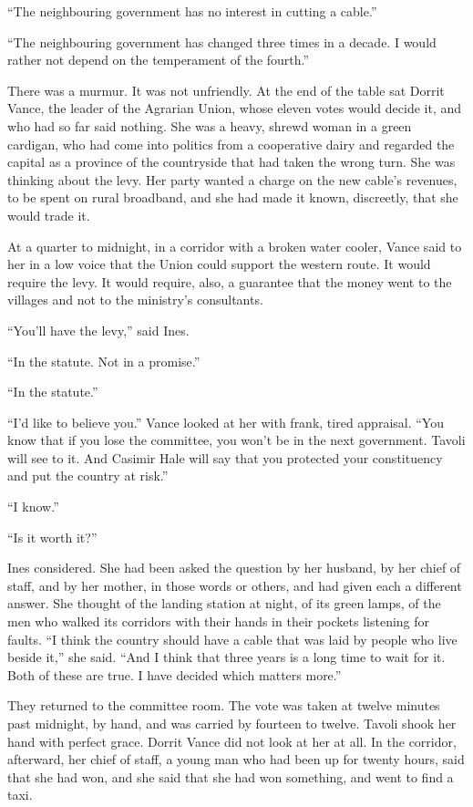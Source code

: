 ``The neighbouring government has no interest in cutting a cable.''

``The neighbouring government has changed three times in a decade. I would rather not depend on the temperament of the fourth.''

There was a murmur. It was not unfriendly. At the end of the table sat Dorrit Vance, the leader of the Agrarian Union, whose eleven votes would decide it, and who had so far said nothing. She was a heavy, shrewd woman in a green cardigan, who had come into politics from a cooperative dairy and regarded the capital as a province of the countryside that had taken the wrong turn. She was thinking about the levy. Her party wanted a charge on the new cable's revenues, to be spent on rural broadband, and she had made it known, discreetly, that she would trade it.

At a quarter to midnight, in a corridor with a broken water cooler, Vance said to her in a low voice that the Union could support the western route. It would require the levy. It would require, also, a guarantee that the money went to the villages and not to the ministry's consultants.

``You'll have the levy,'' said Ines.

``In the statute. Not in a promise.''

``In the statute.''

``I'd like to believe you.'' Vance looked at her with frank, tired appraisal. ``You know that if you lose the committee, you won't be in the next government. Tavoli will see to it. And Casimir Hale will say that you protected your constituency and put the country at risk.''

``I know.''

``Is it worth it?''

Ines considered. She had been asked the question by her husband, by her chief of staff, and by her mother, in those words or others, and had given each a different answer. She thought of the landing station at night, of its green lamps, of the men who walked its corridors with their hands in their pockets listening for faults. ``I think the country should have a cable that was laid by people who live beside it,'' she said. ``And I think that three years is a long time to wait for it. Both of these are true. I have decided which matters more.''

They returned to the committee room. The vote was taken at twelve minutes past midnight, by hand, and was carried by fourteen to twelve. Tavoli shook her hand with perfect grace. Dorrit Vance did not look at her at all. In the corridor, afterward, her chief of staff, a young man who had been up for twenty hours, said that she had won, and she said that she had won something, and went to find a taxi.

